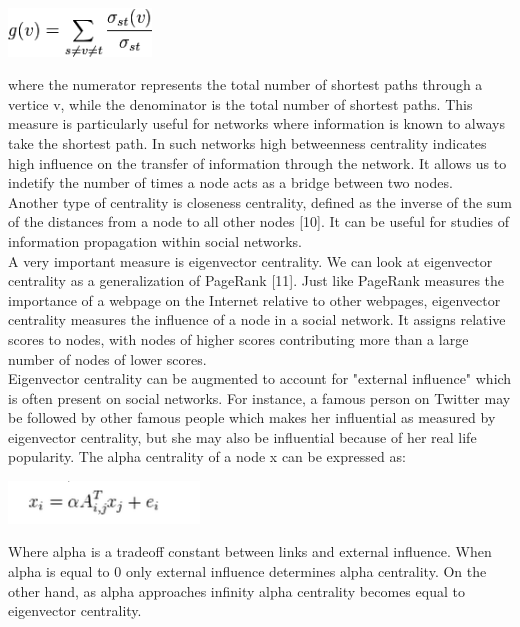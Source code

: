 \documentclass[conference,letterpaper]{IEEEtran}
\begin{document}
\centerline{
  \includegraphics[width=1.5in]{betweenness_centrality.png}
}
where the numerator represents the total number of shortest paths through a vertice v, while the denominator
is the total number of shortest paths. This measure is particularly useful for networks where information is
known to always take the shortest path. In such networks high betweenness centrality indicates high influence
on the transfer of information through the network. It allows us to indetify the number of times a node acts
as a bridge between two nodes.\\
\indent
Another type of centrality is closeness centrality, defined as the inverse of the sum of the distances from
a node to all other nodes [10]. It can be useful for studies of information propagation within social networks.\\
\indent
A very important measure is eigenvector centrality. We can look at eigenvector centrality as a generalization
of PageRank [11]. Just like PageRank measures the importance of a webpage on the Internet relative to other
webpages, eigenvector centrality measures the influence of a node in a social network. It assigns relative
scores to nodes, with nodes of higher scores contributing more than a large number of nodes of lower scores. \\
\indent
Eigenvector centrality can be augmented to account for "external influence" which is often present on social
networks. For instance, a famous person on Twitter may be followed by other famous people which makes her
influential as measured by eigenvector centrality, but she may also be influential because of her real life
popularity. The alpha centrality of a node x can be expressed as:\\

\centerline{
  \includegraphics[width=2.0in]{alpha_centrality.png}
}
Where alpha is a tradeoff constant between links and external influence. When alpha is equal to 0 only
external influence determines alpha centrality. On the other hand, as alpha approaches infinity alpha
centrality becomes equal to eigenvector centrality.\\
\end{document}
